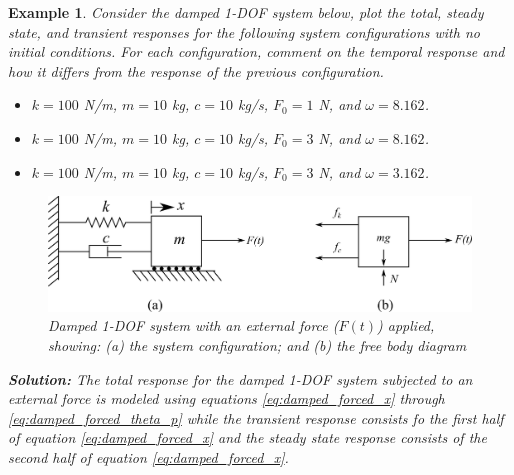 \documentclass[12pt,letter]{article}
\newtheorem{ex}{Example}
\numberwithin{ex}{section} %
\newenvironment{example}{\begin{mdframed}[middlelinewidth=0.5mm]\begin{ex}\normalfont}{\end{ex}\end{mdframed}}
\numberwithin{re}{section} %
\begin{document}
			\begin{example}
			\label{ex:homogeneous_and_particular_solutions_in_resonance}		
				Consider the damped 1-DOF system below, plot the total, steady state, and transient responses for the following system configurations with no initial conditions. For each configuration, comment on the temporal response and how it differs from the response of the previous configuration.    
				
				\begin{itemize}
				\item[a)] $k=100$ N/m, $m=10$ kg,  $c=10$ kg/s, $F_0=1$ N, and $\omega = 8.162$.
				\item[b)] $k=100$ N/m, $m=10$ kg,  $c=10$ kg/s, $F_0=3$ N, and $\omega = 8.162$.
				\item[c)] $k=100$ N/m, $m=10$ kg,  $c=10$ kg/s, $F_0=3$ N, and $\omega = 3.162$.
				\end{itemize}
				
				\begin{figure}[H]
					\centering
					\includegraphics[]{../Figures/1-DOF-spring_dashpot_mass_horizontal_forced_FBD.png}
					\caption{Damped 1-DOF system with an external force ($F(t)$) applied, showing: (a) the system configuration; and (b) the free body diagram}
				\end{figure}
				
				\noindent\textbf{Solution:} The total response for the damped 1-DOF system subjected to an external force is modeled using equations \ref{eq:damped_forced_x} through \ref{eq:damped_forced_theta_p} while the transient response consists fo the first half of equation \ref{eq:damped_forced_x} and the steady state response consists of the second half of equation \ref{eq:damped_forced_x}.  
				

\end{example}
\end{document}
